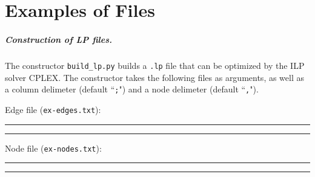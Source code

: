 \documentclass[12pt,twoside]{reedthesis}
\theoremstyle{definition}
\begin{document}
    \appendix
      \chapter{Examples of Files}

        \paragraph{Construction of LP files.}The constructor \verb|build_lp.py| builds a \texttt{.lp} file that can be optimized by the ILP solver CPLEX. The constructor takes the following files as arguments, as well as a column delimeter (default ``\texttt{;}") and a node delimeter (default ``\texttt{,}").

        Edge file (\texttt{ex-edges.txt}):\\
        \rule{\textwidth}{1pt}
        
        \rule{\textwidth}{1pt}

        \newpage

        Node file (\texttt{ex-nodes.txt}):\\
        \rule{\textwidth}{1pt}
        
        \rule{\textwidth}{1pt}

        \newpage
\end{document}
